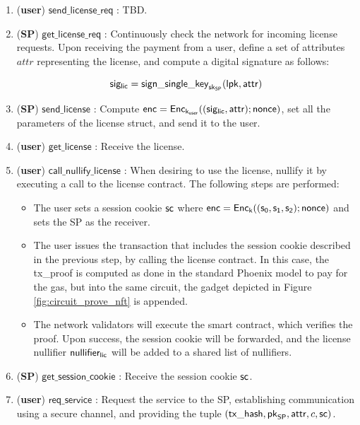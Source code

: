 \begin{enumerate}
	\item (\textbf{user}) $\mathsf{send\_license\_req}$ : TBD.

	\item (\textbf{SP}) $\mathsf{get\_license\_req}$ : Continuously check the network for incoming license requests. Upon receiving the payment from a user, define a set of attributes $attr$ representing the license, and compute a digital signature as follows:

	$$\mathsf{sig_{lic}} = \mathsf{sign\_single\_key}_{\mathsf{sk}_{\mathsf{SP}}}(\mathsf{lpk}, \mathsf{attr})$$

	\item (\textbf{SP}) $\mathsf{send\_license}$ : Compute $\mathsf{enc} = \mathsf{Enc}_{\mathsf{k}_{\mathsf{user}}} ((\mathsf{sig_{lic}}, \mathsf{attr}); \mathsf{nonce})$, set all the parameters of the license struct, and send it to the user.

	\item (\textbf{user}) $\mathsf{get\_license}$ : Receive the license. 

	\item (\textbf{user}) $\mathsf{call\_nullify\_license}$ : When desiring to use the license, nullify it by executing a call to the license contract. The following steps are performed:

	\begin{itemize}
		\item The user sets a session cookie $\mathsf{sc}$ where $\mathsf{enc} = \mathsf{Enc}_{\mathsf{k}} ((\mathsf{s_0}, \mathsf{s_1}, \mathsf{s_2}); \mathsf{nonce})$ and sets the SP as the receiver.
		\item The user issues the transaction that includes the session cookie described in the previous step, by calling the license contract. In this case, the \textsf{tx\_proof} is computed as done in the standard Phoenix model to pay for the gas, but into the same circuit, the gadget depicted in Figure \ref{fig:circuit_prove_nft} is appended.
		\item The network validators will execute the smart contract, which verifies the proof. Upon success, the session cookie will be forwarded, and the license nullifier $\mathsf{nullifier_{lic}}$ will be added to a shared list of nullifiers.
	\end{itemize}

	\item (\textbf{SP}) $\mathsf{get\_session\_cookie}$ : Receive the session cookie $\mathsf{sc}$.

	\item (\textbf{user}) $\mathsf{req\_service}$ : Request the service to the SP, establishing communication using a secure channel, and providing the tuple $(\mathsf{tx\_hash}, \mathsf{pk}_{\mathsf{SP}}, \mathsf{attr}, c, \mathsf{sc})$.


\end{enumerate}
